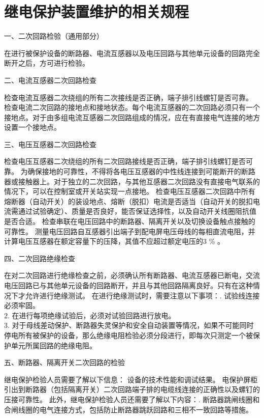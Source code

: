 \section{继电保护装置维护的相关规程}
一、二次回路检验（通用部分）\par
在进行被保护设备的断路器、电流互感器以及电压回路与其他单元设备的回路完全断开之后，方可进行检验。\par
二、电流互感器二次回路检查\par
检查电流互感器二次绕组的所有二次接线是否正确，端子排引线螺钉是否可靠。
检查电流二次回路的接地点和接地状态。每个电流互感器的二次回路必须只有一个接地点。对于由多组电流互感器二次回路组成的情况，应在有直接电气连接的地方设置一个接地点。\par
三、电压互感器二次回路检查\par
检查电压互感器二次绕组的所有二次回路接线是否正确，端子排引线螺钉是否可靠。
为确保接地的可靠性，不得将各电压互感器的中性线连接到可能断开的断路器或接触器上。对于独立的二次回路，与其他互感器二次回路没有直接电气联系的情况下，可以在控制室或开关站实现一点接地。
检查电压互感器二次回路中所有熔断器（自动开关）的装设地点、熔断（脱扣）电流是否适当（自动开关的脱扣电流需通过试验确定）、质量是否良好，能否保证选择性，以及自动开关线圈阻抗值是否合适。
检查串联在电压回路中的断路器、隔离开关以及切换设备触点接触的可靠性。
测量电压回路自互感器引出端子到配电屏电压母线的每相直流电阻，并计算电压互感器在额定容量下的压降，其值不应超过额定电压的3 \% 。\par
四、二次回路绝缘检查\par
在对二次回路进行绝缘检查之前，必须确认所有断路器、电流互感器已断电，交流电压回路已与其他单元设备的回路断开，并且与其他回路隔离良好。只有在这种情况下才允许进行绝缘测试。
在进行绝缘测试时，需要注意以下事项：.	试验线连接必须牢固。\\
2.	在进行每项绝缘试验后，必须对试验回路进行放电。\\
3.	对于母线差动保护、断路器失灵保护和安全自动装置等情况，如果不可能同时停电所有被保护的设备，那么绝缘电阻检验必须分段进行，即每次只测定一个被保护单元所属回路的绝缘电阻。\par
五、断路器、隔离开关二次回路的检验\par
继电保护检验人员需要了解以下信息：
设备的技术性能和调试结果。
电保护屏柜引出到断路器（包括隔离开关）二次回路端子排的电缆线连接的正确性以及螺钉的压接可靠性。
此外，继电保护检验人员还需要了解以下内容：.  断路器跳闸线圈和合闸线圈的电气连接方式，包括防止断路器跳跃回路和三相不一致回路等措施。\\
